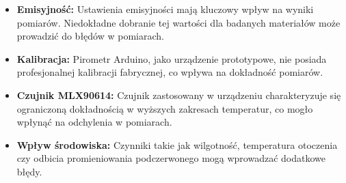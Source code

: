 \begin{itemize}
    \item \textbf{Emisyjność:} Ustawienia emisyjności mają kluczowy wpływ na wyniki pomiarów. Niedokładne dobranie tej wartości dla badanych materiałów może prowadzić do błędów w pomiarach.
    \item \textbf{Kalibracja:} Pirometr Arduino, jako urządzenie prototypowe, nie posiada profesjonalnej kalibracji fabrycznej, co wpływa na dokładność pomiarów.
    \item \textbf{Czujnik MLX90614:} Czujnik zastosowany w urządzeniu charakteryzuje się ograniczoną dokładnością w wyższych zakresach temperatur, co mogło wpłynąć na odchylenia w pomiarach.
    \item \textbf{Wpływ środowiska:} Czynniki takie jak wilgotność, temperatura otoczenia czy odbicia promieniowania podczerwonego mogą wprowadzać dodatkowe błędy.
\end{itemize}


